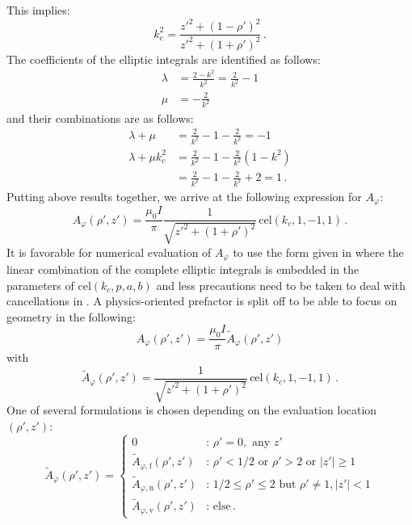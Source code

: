 This implies:
\begin{equation}
  k_c^2 = \frac{z'^2 + (1 - \rho')^2}{z'^2 + (1 + \rho')^2} \, . \label{eqn:kCSq_general}
\end{equation}
The coefficients of the elliptic integrals are identified as follows:
\begin{align}
  \lambda &= \frac{2 - k^2}{k^2} = \frac{2}{k^2} - 1 \\
  \mu     &= -\frac{2}{k^2}
\end{align}
and their combinations are as follows:
\begin{align}
  \lambda + \mu       &= \frac{2}{k^2} - 1 - \frac{2}{k^2}     = -1 \\
  \lambda + \mu k_c^2 &= \frac{2}{k^2} - 1 - \frac{2}{k^2} (1 - k^2) \nonumber \\
          ~           &= \frac{2}{k^2} - 1 - \frac{2}{k^2} + 2 =  1 \, .
\end{align}
Putting above results together, we arrive at the following expression for $A_\varphi$:
\begin{equation}
 A_\varphi(\rho', z') = \frac{\mu_0 I}{\pi}
                        \frac{1}{\sqrt{z'^2 + (1 + \rho')^2}} \,\mathrm{cel}(k_c, 1, -1, 1) \, . \label{eqn:cwl_A_phi_cel}
\end{equation}
It is favorable for numerical evaluation of $A_\varphi$ to use the form given in 
where the linear combination of the complete elliptic integrals is embedded in the parameters of $\mathrm{cel}(k_c, p, a, b)$
and less precautions need to be taken to deal with cancellations in .
A physics-oriented prefactor is split off to be able to focus on geometry in the following:
\begin{equation}
  A_\varphi(\rho', z') = \frac{\mu_0 I}{\pi} \tilde{A}_\varphi(\rho',z') \label{eqn:norm_A_phi}
\end{equation}
with
\begin{equation}
  \tilde{A}_\varphi(\rho',z')
  = \frac{1}{\sqrt{z'^2 + (1 + \rho')^2}} \,\mathrm{cel}(k_c, 1, -1, 1) \, .
\end{equation}
One of several formulations is chosen depending on the evaluation location~$(\rho', z')$:
\begin{equation}
  \tilde{A}_\varphi (\rho', z') =
  \begin{cases}
    0                                          &:\, \rho' = 0 , \textrm{ any } z' \\
    \tilde{A}_{\varphi,\mathrm{f}} (\rho', z') &:\, \rho' < 1/2 \textrm{ or } \rho' > 2 \textrm{ or } |z'| \geq 1 \\
    \tilde{A}_{\varphi,\mathrm{n}} (\rho', z') &:\, 1/2 \leq \rho' \leq 2 \textrm{ but } \rho' \neq 1, |z'| < 1 \\
    \tilde{A}_{\varphi,\mathrm{v}} (\rho', z') &:\, \textrm{else} \, .
  \end{cases} \label{eqn:A_phi_final}
\end{equation}
